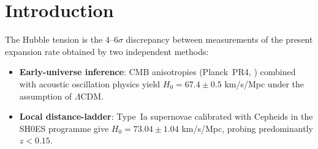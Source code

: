 \documentclass[12pt,a4paper]{article}
\newcommand{\phiG}{\varphi}
\renewcommand{\Omega}{\varOmega}
\begin{document}
\begin{abstract}
{ultraviolet completion is included.  In either case the propagated uncertainty
$\pm0.970$, inherited from the SH0ES input, dominates over the residual
against the pure number.}
The comparison is a
coincidence of value, not an identity: $3(\phiG+\pi)^2$ is a pure number and
carries no units, whereas $H_0^{\rm glob}$ inherits km\,s$^{-1}$\,Mpc$^{-1}$
from the measurement. The agreement is therefore an output of the cascade,
never its input.
This adopts the single algebraic target $3(\phiG+\pi)^2$ shared by every sector
of the suite (2026 reframe). The earlier register used the CMB-mapped value
$H_0^{\rm MIRA}=67.037$, giving $H_0^{\rm local}=71.87$ ($1.12\sigma$); this is now
superseded. The 2026 $\omega_m$-direct reframe adopts the single algebraic anchor
$3(\varphi+\pi)^2=67.96214$ as the algebraic target shared by all
sectors --- with \emph{no} matter factor, the CMB density following as
$\Omega_{m,\rm CMB}=\omega_m/h^2$ (Paper~1).
The correction operates at late times ($z < 0.15$) through the scalar kinetic
energy contribution to the local expansion rate, and does not modify the
sound horizon $r_d$, the CMB peak positions, or the growth factor $\sigma_8$
derived in Papers~3 and~5.
The UV completion of Paper~10 sharpens the residual to
$4.2\times10^{-6}$ ($H_0^{\rm glob,UV} = 67.96214$), the small-scale
refinement of the same cascade.
\end{abstract}

\clearpage
{\small\tableofcontents}
\clearpage

\section{Introduction}
\label{sec:intro}

The Hubble tension \citep{Verde2019,Riess2022,Kamionkowski2023,DiValentino2021,Knox2020}
is the $4$--$6\sigma$ discrepancy between measurements of the present expansion
rate obtained by two independent methods:
\begin{itemize}
  \item \textbf{Early-universe inference}: CMB anisotropies (Planck~PR4,
        \citealt{Planck2020}) combined with acoustic oscillation physics
        yield $H_0 = 67.4\pm0.5$ km/s/Mpc under the assumption of
        $\Lambda$CDM.
  \item \textbf{Local distance-ladder}: Type~Ia supernovae
        \citep{Riess1998,Perlmutter1999} calibrated with
        Cepheids in the SH0ES programme \citep{Riess2019,Riess2022} give
        $H_0 = 73.04\pm1.04$ km/s/Mpc, probing predominantly $z < 0.15$.
\end{itemize}
\end{document}
